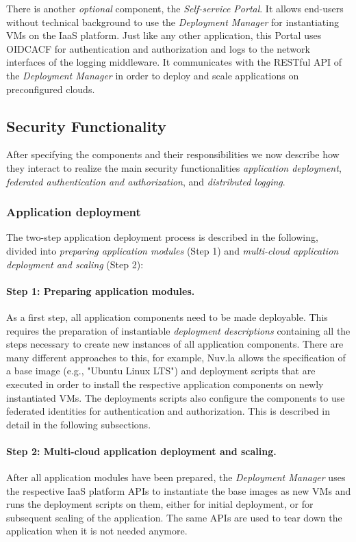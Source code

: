 \documentclass{llncs}
\begin{document}
There is another \textit{optional} component, the \textit{Self-service Portal}. It allows end-users without technical background to use the \textit{Deployment Manager} for instantiating VMs on the IaaS platform. Just like any other application, this Portal uses OIDCACF for authentication and authorization and logs to the network interfaces of the logging middleware. It communicates with the RESTful API of the \textit{Deployment Manager} in order to deploy and scale applications on preconfigured clouds.

\subsection{Security Functionality}

After specifying the components and their responsibilities we now describe how they interact to realize the main security functionalities \textit{application deployment}, \textit{federated authentication and authorization}, and \textit{distributed logging}.

\subsubsection{Application deployment}

The two-step application deployment process is described in the following, divided into \textit{preparing application modules} (Step 1) and \textit{multi-cloud application deployment and scaling} (Step 2):

\paragraph{Step 1: Preparing application modules.} As a first step, all application components need to be made deployable. This requires the preparation of instantiable \textit{deployment descriptions} containing all the steps necessary to create new instances of all application components. There are many different approaches to this, for example, Nuv.la allows the specification of a base image (e.g., "Ubuntu Linux LTS") and deployment scripts that are executed in order to install the respective application components on newly instantiated VMs. The deployments scripts also configure the components to use federated identities for authentication and authorization. This is described in detail in the following subsections.

\paragraph{Step 2: Multi-cloud application deployment and scaling.} After all application modules have been prepared, the \textit{Deployment Manager} uses the respective IaaS platform APIs to instantiate the base images as new VMs and runs the deployment scripts on them, either for initial deployment, or for subsequent scaling of the application. The same APIs are used to tear down the application when it is not needed anymore.
\end{document}
